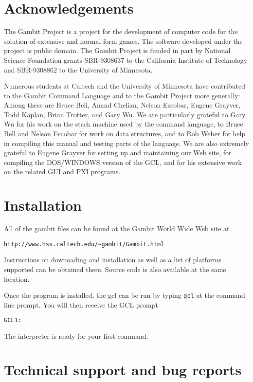 \section{Acknowledgements}

The Gambit Project is a project for the development of computer code
for the solution of extensive and normal form games.  The software
developed under the project is public domain.  The Gambit Project is
funded in part by National Science Foundation grants SBR-9308637 to
the California Institute of Technology and SBR-9308862 to the
University of Minnesota.

Numerous students at Caltech and the University of Minnesota have
contributed to the Gambit Command Language and to the Gambit Project
more generally: Among these are Bruce Bell, Anand Chelian, Nelson
Escobar, Eugene Grayver, Todd Kaplan, Brian Trotter, and Gary Wu.  We
are particularly grateful to Gary Wu for his work on the stack machine
used by the command language, to Bruce Bell and Nelson Escobar for
work on data structures, and to Rob Weber for help in compiling this
manual and testing parts of the language.  We are also extremely
grateful to Eugene Grayver for setting up and maintaining our Web
site, for compiling the DOS/WINDOWS version of the GCL, and for his
extensive work on the related GUI and PXI programs.

\section{Installation}

All of the gambit files can be found at the Gambit World Wide Web site
at

\begin{verbatim}
http://www.hss.caltech.edu/~gambit/Gambit.html
\end{verbatim} 

\noindent Instructions on downoading and installation as well as a
list of platforms supported can be obtained there.  Source code is
also available at the same location. 

Once the program is installed, the gcl can be run by typing \verb+gcl+
at the command line prompt.  You will then receive the GCL prompt 

\begin{verbatim}
GCL1:
\end{verbatim}

\noindent The interpreter is ready for your first command.


\section{Technical support and bug reports}

